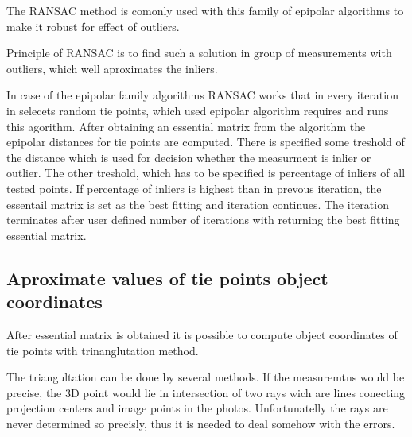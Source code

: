 \documentclass[a4paper,12pt]{report}
\begin{document}
The RANSAC \cite{RANSAC} method is comonly used with this family of epipolar algorithms to 
make it robust for effect of outliers.

Principle of RANSAC is to find such  a solution in group of measurements with outliers, 
which well aproximates the inliers. 

In case of the epipolar family algorithms RANSAC works that in every iteration 
in selecets random tie points, which used epipolar algorithm requires and 
runs this agorithm. After obtaining an essential matrix from the algorithm the epipolar 
distances for tie points are computed. There is specified some treshold of the distance which is used 
for decision whether the measurment is inlier or outlier. The other treshold, which has to be specified 
is percentage of inliers of all tested points. If percentage of inliers is highest than in prevous iteration,
the essentail matrix is set as the best fitting and iteration continues. The iteration terminates after user defined 
number of iterations with returning the best fitting essential matrix.

\subsection{Aproximate values  of tie points object coordinates}

After essential matrix is obtained it is possible to compute object coordinates of tie points with trinanglutation
method.

The triangultation can be done by several methods. If the measuremtns would be precise, the 3D point 
would lie in intersection of two rays wich are lines conecting projection centers and image points 
in the photos. Unfortunatelly the rays are never determined so precisly, thus it is needed to deal 
somehow with the errors. 
\end{document}
